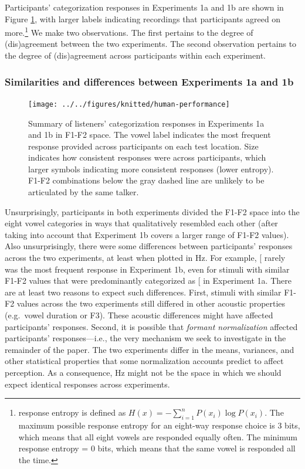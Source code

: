 \documentclass[preprint]{JASA}
\begin{document}
Participants' categorization responses in Experiments 1a and 1b are shown in Figure \ref{fig:human-performance}, with larger labels indicating recordings that participants agreed on more.\footnote{\citet{shannon1948} response entropy is defined as \(H(x) = -\sum_{i=1}^{n} P(x_{i}) \log P(x_{i})\). The maximum possible response entropy for an eight-way response choice is 3 bits, which means that all eight vowels are responded equally often. The minimum response entropy = 0 bits, which means that the same vowel is responded all the time.} We make two observations. The first pertains to the degree of (dis)agreement between the two experiments. The second observation pertains to the degree of (dis)agreement across participants within each experiment.

\subsubsection{Similarities and differences between Experiments 1a and 1b}\label{similarities-and-differences-between-experiments-1a-and-1b}

\begin{figure}

{\centering \texttt{[image: ../../figures/knitted/human-performance]} 

}

\caption{Summary of listeners' categorization responses in Experiments 1a and 1b in F1-F2 space. The vowel label indicates the most frequent response provided across participants on each test location. Size indicates how consistent responses were across participants, which larger symbols indicating more consistent responses (lower entropy). F1-F2 combinations below the gray dashed line are unlikely to be articulated by the same talker.}\label{fig:human-performance}
\end{figure}



Unsurprisingly, participants in both experiments divided the F1-F2 space into the eight vowel categories in ways that qualitatively resembled each other (after taking into account that Experiment 1b covers a larger range of F1-F2 values). Also unsurprisingly, there were some differences between participants' responses across the two experiments, at least when plotted in Hz. For example, {[}\ipatext{u}{]} rarely was the most frequent response in Experiment 1b, even for stimuli with similar F1-F2 values that were predominantly categorized as {[}\ipatext{u}{]} in Experiment 1a. There are at least two reasons to expect such differences. First, stimuli with similar F1-F2 values across the two experiments still differed in other acoustic properties (e.g.~vowel duration or F3). These acoustic differences might have affected participants' responses. Second, it is possible that \emph{formant normalization} affected participants' responses---i.e., the very mechanism we seek to investigate in the remainder of the paper. The two experiments differ in the means, variances, and other statistical properties that some normalization accounts predict to affect perception. As a consequence, Hz might not be the space in which we should expect identical responses across experiments.
\end{document}
